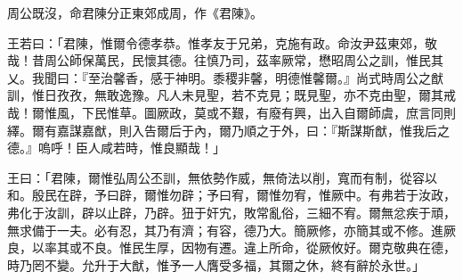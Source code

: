 
\begin{pinyinscope}
周公既沒，命君陳分正東郊成周，作《君陳》。

王若曰：「君陳，惟爾令德孝恭。惟孝友于兄弟，克施有政。命汝尹茲東郊，敬哉！昔周公師保萬民，民懷其德。往慎乃司，茲率厥常，懋昭周公之訓，惟民其乂。我聞曰：『至治馨香，感于神明。黍稷非馨，明德惟馨爾。』尚式時周公之猷訓，惟日孜孜，無敢逸豫。凡人未見聖，若不克見；既見聖，亦不克由聖，爾其戒哉！爾惟風，下民惟草。圖厥政，莫或不艱，有廢有興，出入自爾師虞，庶言同則繹。爾有嘉謀嘉猷，則入告爾后于內，爾乃順之于外，曰：『斯謀斯猷，惟我后之德。』嗚呼！臣人咸若時，惟良顯哉！」

王曰：「君陳，爾惟弘周公丕訓，無依勢作威，無倚法以削，寬而有制，從容以和。殷民在辟，予曰辟，爾惟勿辟；予曰宥，爾惟勿宥，惟厥中。有弗若于汝政，弗化于汝訓，辟以止辟，乃辟。狃于奸宄，敗常亂俗，三細不宥。爾無忿疾于頑，無求備于一夫。必有忍，其乃有濟；有容，德乃大。簡厥修，亦簡其或不修。進厥良，以率其或不良。惟民生厚，因物有遷。違上所命，從厥攸好。爾克敬典在德，時乃罔不變。允升于大猷，惟予一人膺受多福，其爾之休，終有辭於永世。」


\end{pinyinscope}